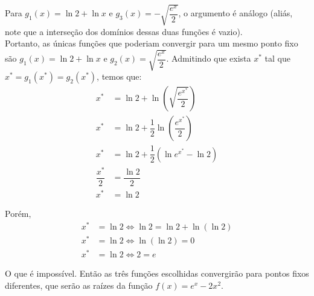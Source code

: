 \documentclass{article}
\begin{document}
  Para $g_1(x) = \ln 2 + \ln x$ e $g_3(x) =  - \sqrt{\dfrac{e^x}{2}}$, o argumento é análogo (aliás, note que a interseção dos domínios dessas duas funções é vazio).\\
  Portanto, as únicas funções que poderiam convergir para um mesmo ponto fixo são 
  $g_1(x) = \ln 2 + \ln x$ e $g_2(x) = \sqrt{\dfrac{e^x}{2}}$. Admitindo que exista $x^*$ tal que $x^* = g_1(x^*) = g_2(x^*)$, temos que:
  \begin{align*}
  x^* &= \ln 2 + \ln \left(\sqrt{\dfrac{e^{x^*}}{2}}\right)
  \\
  x^* &= \ln 2 + \dfrac{1}{2} \ln \left(\dfrac{e^{x^*}}{2}\right)
  \\
  x^* &= \ln 2 + \dfrac{1}{2} \left(\ln e^{x^*} - \ln 2 \right)
  \\
  \dfrac{x^*}{2} &= \dfrac{\ln 2}{2} 
  \\
  x^* &= \ln 2    
  \end{align*}
  
  Porém, 
  \begin{align*}
  x^* &= \ln 2 \iff \ln 2 = \ln 2 + \ln(\ln 2)
  \\
  x^* &= \ln 2 \iff \ln(\ln 2) = 0
  \\
  x^* &= \ln 2 \iff 2 = e    
  \end{align*}
  
  O que é impossível.
  Então as três funções escolhidas convergirão para pontos fixos diferentes, que serão as raízes da função $f(x) = e^x - 2x^2$.
  
\end{document}
